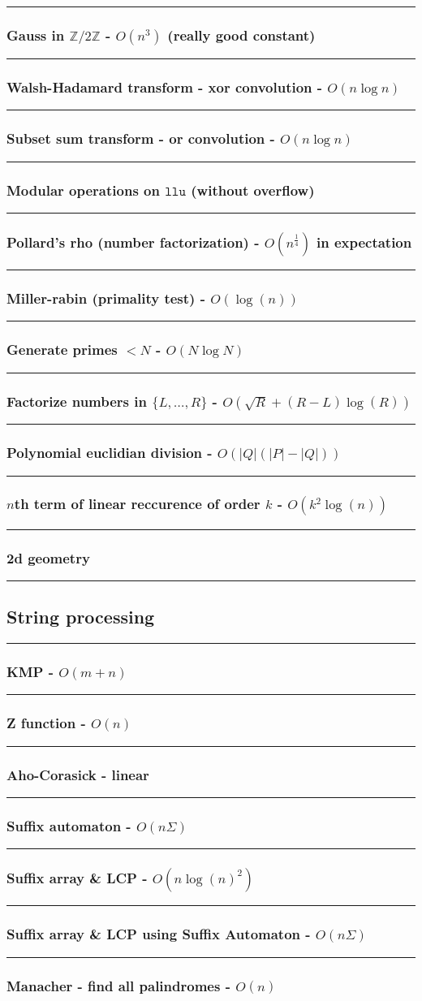 \documentclass[landscape,a4paper,twocolumn,10pt]{report}
\renewcommand{\line}{\noindent\rule{\linewidth}{1pt}}
\newcommand{\algosection}[1]{\line \subsection*{#1}}
\newcommand{\algorithm}[1]{\line \subsubsection*{#1}}
\begin{document}
\algorithm{Gauss in $\mathbb Z/2\mathbb Z$ - $O(n^3)$ (really good constant)}


\algorithm{Walsh-Hadamard transform - xor convolution - $O(n \log n)$}


\algorithm{Subset sum transform - or convolution - $O(n \log n)$}


\algorithm{Modular operations on $\texttt{llu}$ (without overflow)}


\algorithm{Pollard's rho (number factorization) - $O(n^{\frac{1}{4}})$ in expectation}


\algorithm{Miller-rabin (primality test) - $O(\log(n))$}


\algorithm{Generate primes $< N$ - $O(N \log N)$}


\algorithm{Factorize numbers in $\{L, \dots, R\}$ - $O(\sqrt{R} + (R-L) \log(R))$}


\algorithm{Polynomial euclidian division - $O(|Q|(|P|-|Q|))$}


\algorithm{$n$th term of linear reccurence of order $k$ - $O(k^2 \log(n))$}


\algorithm{2d geometry}


\algosection{String processing}
\label{string}

\algorithm{KMP - $O(m+n)$}


\algorithm{Z function - $O(n)$}


\algorithm{Aho-Corasick - linear}


\algorithm{Suffix automaton - $O(n \Sigma)$}


\algorithm{Suffix array \& LCP - $O(n \log(n)^2)$}


\algorithm{Suffix array \& LCP using Suffix Automaton - $O(n \Sigma)$}


\algorithm{Manacher - find all palindromes - $O(n)$}

\end{document}
